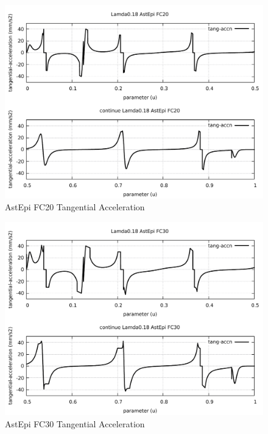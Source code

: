 \begin{figure}
	\caption     {AstEpi FC20 Tangential Acceleration}
	\label{22-img-AstEpi-FC20-Tangential-Acceleration.pdf}
\includegraphics[width=1.00\textwidth]{Chap4/appendix/app-AstEpi/plots/22-img-AstEpi-FC20-Tangential-Acceleration.pdf}
\end{figure}

\clearpage
\pagebreak

\begin{figure}
	\caption     {AstEpi FC30 Tangential Acceleration}
	\label{23-img-AstEpi-FC30-Tangential-Acceleration.pdf}
\includegraphics[width=1.00\textwidth]{Chap4/appendix/app-AstEpi/plots/23-img-AstEpi-FC30-Tangential-Acceleration.pdf}
\end{figure}


